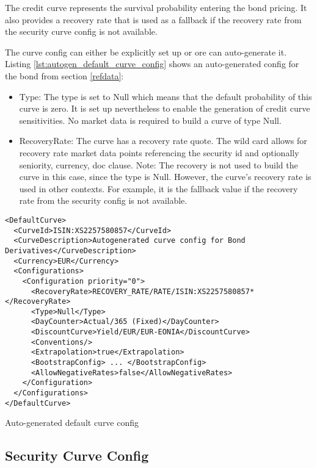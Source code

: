 \documentclass[12pt, a4paper]{article}
\begin{document}
The credit curve represents the survival probability entering the bond pricing. It also provides a recovery rate that is
used as a fallback if the recovery rate from the security curve config is not available.

The curve config can either be explicitly set up or ore can auto-generate it. Listing
\ref{lst:autogen_default_curve_config} shows an auto-generated config for the bond from section \ref{refdata}:

\begin{itemize}
\item Type: The type is set to Null which means that the default probability of this curve is zero. It is set up
  nevertheless to enable the generation of credit curve sensitivities. No market data is required to build a curve of
  type Null.
\item RecoveryRate: The curve has a recovery rate quote. The wild card allows for recovery rate market data points
  referencing the security id and optionally seniority, currency, doc clause. Note: The recovery is not used to build
  the curve in this case, since the type is Null. However, the curve's recovery rate is used in other contexts. For
  example, it is the fallback value if the recovery rate from the security config is not available.
\end{itemize}

\begin{listing}[H]
\begin{verbatim}
<DefaultCurve>
  <CurveId>ISIN:XS2257580857</CurveId>
  <CurveDescription>Autogenerated curve config for Bond Derivatives</CurveDescription>
  <Currency>EUR</Currency>
  <Configurations>
    <Configuration priority="0">
      <RecoveryRate>RECOVERY_RATE/RATE/ISIN:XS2257580857*</RecoveryRate>
      <Type>Null</Type>
      <DayCounter>Actual/365 (Fixed)</DayCounter>
      <DiscountCurve>Yield/EUR/EUR-EONIA</DiscountCurve>
      <Conventions/>
      <Extrapolation>true</Extrapolation>
      <BootstrapConfig> ... </BootstrapConfig>
      <AllowNegativeRates>false</AllowNegativeRates>
    </Configuration>
  </Configurations>
</DefaultCurve>
\end{verbatim}
\caption{Auto-generated default curve config}
\label{lst:autogen_default_curve_config}
\end{listing}

\subsection{Security Curve Config}
\end{document}
